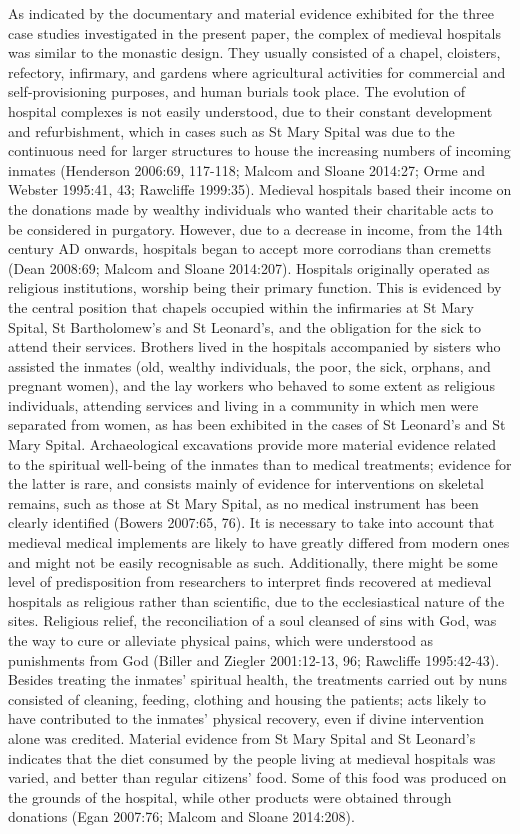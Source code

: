 \documentclass[%
	]{ijsra}
\begin{document}
As indicated by the documentary and material evidence exhibited for the three case studies investigated in the present paper, the complex of medieval hospitals was similar to the monastic design. They usually consisted of a chapel, cloisters, refectory, infirmary, and gardens where agricultural activities for commercial and self-provisioning purposes, and human burials took place. The evolution of hospital complexes is not easily understood, due to their constant development and refurbishment, which in cases such as St Mary Spital was due to the continuous need for larger structures to house the increasing numbers of incoming inmates (Henderson 2006:69, 117-118; Malcom and Sloane 2014:27; Orme and Webster 1995:41, 43; Rawcliffe 1999:35).
Medieval hospitals based their income on the donations made by wealthy individuals who wanted their charitable acts to be considered in purgatory. However, due to a decrease in income, from the 14th century AD onwards, hospitals began to accept more corrodians than cremetts (Dean 2008:69; Malcom and Sloane 2014:207). 
Hospitals originally operated as religious institutions, worship being their primary function. This is evidenced by the central position that chapels occupied within the infirmaries at St Mary Spital, St Bartholomew’s and St Leonard’s, and the obligation for the sick to attend their services. Brothers lived in the hospitals accompanied by sisters who assisted the inmates (old, wealthy individuals, the poor, the sick, orphans, and pregnant women), and the lay workers who behaved to some extent as religious individuals, attending services and living in a community in which men were separated from women, as has been exhibited in the cases of St Leonard’s and St Mary Spital. 
Archaeological excavations provide more material evidence related to the spiritual well-being of the inmates than to medical treatments; evidence for the latter is rare, and consists mainly of evidence for interventions on skeletal remains, such as those at St Mary Spital, as no medical instrument has been clearly identified (Bowers 2007:65, 76). It is necessary to take into account that medieval medical implements are likely to have greatly differed from modern ones and might not be easily recognisable as such. Additionally, there might be some level of predisposition from researchers to interpret finds recovered at medieval hospitals as religious rather than scientific, due to the ecclesiastical nature of the sites. 
Religious relief, the reconciliation of a soul cleansed of sins with God, was the way to cure or alleviate physical pains, which were understood as punishments from God (Biller and Ziegler 2001:12-13, 96; Rawcliffe 1995:42-43). Besides treating the inmates’ spiritual health, the treatments carried out by nuns consisted of cleaning, feeding, clothing and housing the patients; acts likely to have contributed to the inmates’ physical recovery, even if divine intervention alone was credited. Material evidence from St Mary Spital and St Leonard’s indicates that the diet consumed by the people living at medieval hospitals was varied, and better than regular citizens’ food. Some of this food was produced on the grounds of the hospital, while other products were obtained through donations (Egan 2007:76; Malcom and Sloane 2014:208).
\end{document}
